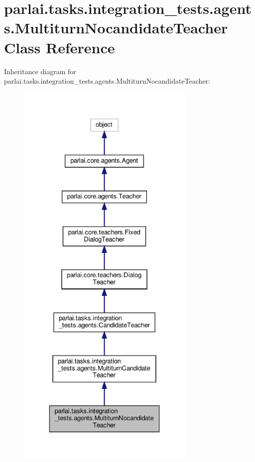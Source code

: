 \hypertarget{classparlai_1_1tasks_1_1integration__tests_1_1agents_1_1MultiturnNocandidateTeacher}{}\section{parlai.\+tasks.\+integration\+\_\+tests.\+agents.\+Multiturn\+Nocandidate\+Teacher Class Reference}
\label{classparlai_1_1tasks_1_1integration__tests_1_1agents_1_1MultiturnNocandidateTeacher}


Inheritance diagram for parlai.\+tasks.\+integration\+\_\+tests.\+agents.\+Multiturn\+Nocandidate\+Teacher\+:
\nopagebreak
\begin{figure}[H]
\begin{center}
\leavevmode
\includegraphics[height=550pt]{classparlai_1_1tasks_1_1integration__tests_1_1agents_1_1MultiturnNocandidateTeacher__inherit__graph}
\end{center}
\end{figure}



